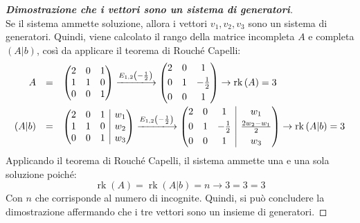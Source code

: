 \documentclass[a4paper]{article}
\makeatletter
\DeclareMathOperator{\rk}{rk}
\newenvironment{rowequmat}[1]{\left(\array{@{}#1@{}}}{\endarray\right)}
\makeatother
\begin{document}
\begin{proof}[\textbf{Dimostrazione che i vettori sono un sistema di generatori}]
\begin{equation*}
		\end{equation*}
		Se il sistema ammette soluzione, allora i vettori $v_{1}, v_{2}, v_{3}$ sono un sistema di generatori. Quindi, viene calcolato il rango della matrice incompleta $A$ e completa $\left(A|b\right)$, così da applicare il teorema di Rouché Capelli:
		\begin{equation*}
			\begin{array}{rll}
				A &=& \begin{rowequmat}{ccc}
					2 & 0 & 1 \\
					1 & 1 & 0 \\
					0 & 0 & 1
				\end{rowequmat} \xlongrightarrow{E_{1,2}\left(-\frac{1}{2}\right)}
				\begin{rowequmat}{ccc}
					2 & 0 & 1 \\ [0.3em]
					0 & 1 & -\frac{1}{2} \\ [0.3em]
					0 & 0 & 1
				\end{rowequmat} \rightarrow \rk\left(A\right) = 3 \\ [1.8em]
				\left(A|b\right) &=& \begin{rowequmat}{ccc|c}
					2 & 0 & 1 & w_{1} \\
					1 & 1 & 0 & w_{2} \\
					0 & 0 & 1 & w_{3}
				\end{rowequmat} \xlongrightarrow{E_{1,2}\left(-\frac{1}{2}\right)}
				\begin{rowequmat}{ccc|c}
					2 & 0 & 1 & w_{1} \\ [0.3em]
					0 & 1 & -\frac{1}{2} & \frac{2w_{2} - w_{1}}{2} \\ [0.3em]
					0 & 0 & 1 & w_{3}
				\end{rowequmat} \rightarrow \rk\left(A|b\right) = 3
			\end{array}
		\end{equation*}
		Applicando il teorema di Rouché Capelli, il sistema ammette una e una sola soluzione poiché:
		\begin{equation*}
			\rk\left(A\right) = \rk\left(A|b\right) = n \longrightarrow 3 = 3 = 3
		\end{equation*}
		Con $n$ che corrisponde al numero di incognite. Quindi, si può concludere la dimostrazione affermando che i tre vettori sono un insieme di generatori.
	\end{proof}\newpage
	
\end{document}
